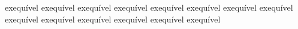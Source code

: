 \documentclass[12pt]{article}
\begin{document}
	\noindent\hrulefill\par
	exequível exequível exequível exequível exequível exequível exequível
	exequível exequível exequível exequível exequível exequível exequível
	
\end{document}
